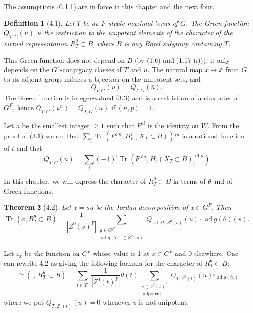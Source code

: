 \documentclass[11pt]{amsart}
\theoremstyle{plain}
\newtheorem{theorem}{Theorem}[section]
\newtheorem{definition}[theorem]{Definition}
\theoremstyle{remark}
\DeclareMathOperator{\Tr}{Tr}
\DeclareMathOperator{\ad}{ad}
\begin{document}
The assumptions (0.1.1) are in force in this chapter and the next four.

\begin{definition}[4.1]
Let $T$ be an $F$-stable maximal torus of $G$. The Green function $Q_{T,G}(u)$ is the restriction to the unipotent elements of the character of the virtual representation $R_T^\theta \subset B$, where $B$ is any Borel subgroup containing $T$.
\end{definition}

This Green function does not depend on $B$ (by (1.6) and (1.17 (i))); it only depends on the $G^F$-conjugacy classes of $T$ and $u$. The natural map $x \mapsto \bar{x}$ from $G$ to its adjoint group induces a bijection on the unipotent sets, and
\begin{equation}\label{eq:4.1.1}
Q_{T,G}(u) = Q_{\bar{T}, \bar{G}}(\bar{u}).
\end{equation}
The Green function is integer-valued (3.3) and is a restriction of a character of $G^F$, hence $Q_{T,G}(u^n) = Q_{T,G}(u)$ if $(n, p) = 1$.

Let $a$ be the smallest integer $\ge 1$ such that $F^{a!}$ is the identity on $W$. From the proof of (3.3) we see that $\sum_i \Tr(F^{a!n}, H_c^i(X_T \subset B))t^n$ is a rational function of $t$ and that
\begin{equation}\label{eq:4.1.2}
Q_{T,G}(u) = \sum_i (-1)^i \Tr(F^{a!n}, H_c^i(X_T \subset B)_u^{\ad u})
\end{equation}

In this chapter, we will express the character of $R_T^\theta \subset B$ in terms of $\theta$ and of Green functions.

\begin{theorem}[4.2]
Let $x = su$ be the Jordan decomposition of $x \in G^F$. Then
\[
\Tr(x, R_T^\theta \subset B) = \frac{1}{|Z^0(s)^F|} \sum_{\substack{g \in G^F \\ \ad g(T) \subset Z^0(s)}} Q_{\ad g T, Z^0(s)}(u) \cdot \ad g(\theta)(s).
\]
\end{theorem}

Let $\varepsilon_x$ be the function on $G^F$ whose value is 1 at $x \in G^F$ and 0 elsewhere. One can rewrite 4.2 as giving the following formula for the character of $R_T^\theta \subset B$:
\begin{equation}\label{eq:4.2.1}
\Tr(\ ,\ R_T^\theta \subset B) = \sum_{t \in T^F} \frac{1}{|Z^0(t)^F|} \theta(t) \sum_{\substack{u \in Z^0(t)^F \\ \text{unipotent}}} Q_{T, Z^0(t)}(u) \varepsilon_{\ad g(tu)}
\end{equation}
where we put $Q_{T, Z^0(t)}(u) = 0$ whenever $u$ is not unipotent.
\end{document}
